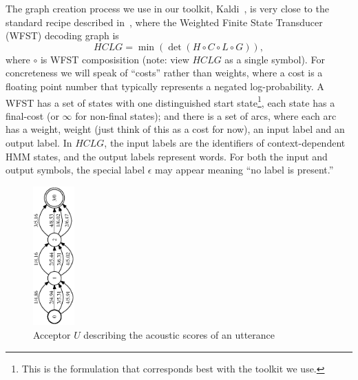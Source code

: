 \documentclass{article}
\def\HCLG{{\mathit{HCLG}}}
\begin{document}
The graph creation process we use in our toolkit, Kaldi~\cite{kaldi_paper},
is very close to the standard recipe described in~\cite{wfst},
where the Weighted Finite State Transducer (WFST) decoding graph is
\begin{equation}
  \HCLG = \min(\det(H \circ C \circ L \circ G)),
\end{equation}
where $\circ$ is WFST composisition (note: view $\HCLG$ as a single symbol).
For concreteness we will speak of ``costs'' rather
than weights, where a cost is a floating point number that typically represents a negated
log-probability.  A WFST has a set of states with one distinguished
start state\footnote{This is the formulation that corresponds best with the toolkit we use.},
each state has a final-cost (or $\infty$ for non-final states);
and there is a set of arcs, where each arc has a weight,
weight (just think of this as a cost for now), an input label and an output
label.  In $\HCLG$, the input labels are the identifiers of context-dependent
HMM states, and the output labels represent words.  For both the input and output
symbols, the special label $\epsilon$ may appear meaning ``no label is present.''


\begin{figure}
\begin{center}
\includegraphics[height=2.1in,angle=270]{figures/acceptor_utterance.eps}
  \caption{Acceptor $U$ describing the acoustic scores of an utterance}
\label{fig:acceptor}
\end{center}
\end{figure}
\end{document}
